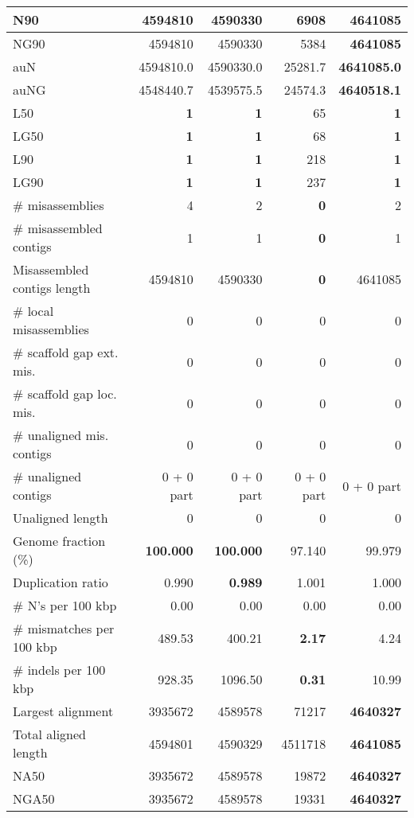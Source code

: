 \documentclass[12pt,a4paper]{article}
\begin{document}
\begin{table}[ht]
\begin{center}
\begin{tabular}{|l*{4}{|r}|}
N90 & 4594810 & 4590330 & 6908 & {\bf 4641085} \\ \hline
NG90 & 4594810 & 4590330 & 5384 & {\bf 4641085} \\ \hline
auN & 4594810.0 & 4590330.0 & 25281.7 & {\bf 4641085.0} \\ \hline
auNG & 4548440.7 & 4539575.5 & 24574.3 & {\bf 4640518.1} \\ \hline
L50 & {\bf 1} & {\bf 1} & 65 & {\bf 1} \\ \hline
LG50 & {\bf 1} & {\bf 1} & 68 & {\bf 1} \\ \hline
L90 & {\bf 1} & {\bf 1} & 218 & {\bf 1} \\ \hline
LG90 & {\bf 1} & {\bf 1} & 237 & {\bf 1} \\ \hline
\# misassemblies & 4 & 2 & {\bf 0} & 2 \\ \hline
\# misassembled contigs & 1 & 1 & {\bf 0} & 1 \\ \hline
Misassembled contigs length & 4594810 & 4590330 & {\bf 0} & 4641085 \\ \hline
\# local misassemblies & 0 & 0 & 0 & 0 \\ \hline
\# scaffold gap ext. mis. & 0 & 0 & 0 & 0 \\ \hline
\# scaffold gap loc. mis. & 0 & 0 & 0 & 0 \\ \hline
\# unaligned mis. contigs & 0 & 0 & 0 & 0 \\ \hline
\# unaligned contigs & 0 + 0 part & 0 + 0 part & 0 + 0 part & 0 + 0 part \\ \hline
Unaligned length & 0 & 0 & 0 & 0 \\ \hline
Genome fraction (\%) & {\bf 100.000} & {\bf 100.000} & 97.140 & 99.979 \\ \hline
Duplication ratio & 0.990 & {\bf 0.989} & 1.001 & 1.000 \\ \hline
\# N's per 100 kbp & 0.00 & 0.00 & 0.00 & 0.00 \\ \hline
\# mismatches per 100 kbp & 489.53 & 400.21 & {\bf 2.17} & 4.24 \\ \hline
\# indels per 100 kbp & 928.35 & 1096.50 & {\bf 0.31} & 10.99 \\ \hline
Largest alignment & 3935672 & 4589578 & 71217 & {\bf 4640327} \\ \hline
Total aligned length & 4594801 & 4590329 & 4511718 & {\bf 4641085} \\ \hline
NA50 & 3935672 & 4589578 & 19872 & {\bf 4640327} \\ \hline
NGA50 & 3935672 & 4589578 & 19331 & {\bf 4640327} \\ \hline

\end{tabular}
\end{center}
\end{table}
\end{document}
